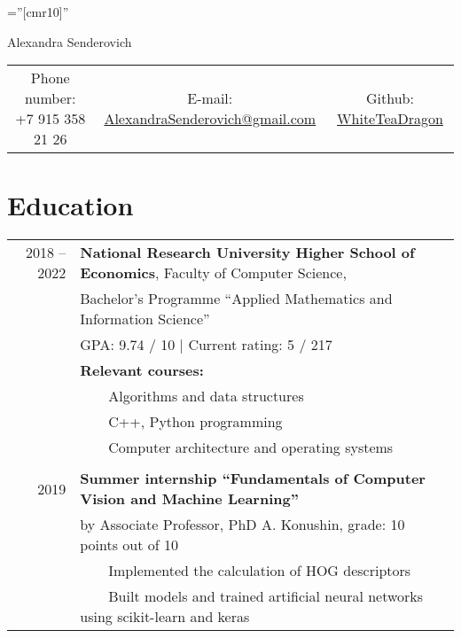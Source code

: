 \documentclass[a4paper,10pt]{article}
\newcommand{\tabitem}{~~\llap{\textbullet}~~}
\begin{document}

\pagestyle{empty} %

\font\fb=''[cmr10]'' %

\par{\centering
		{\Huge Alexandra Senderovich
	}\bigskip\par}


\begin{center}
\begin{tabular}{c c c}
     Phone number: +7 915 358 21 26 & E-mail: \href{mailto:alexandrasenderovich@gmail.com}{AlexandraSenderovich@gmail.com} & Github: \href{https://github.com/WhiteTeaDragon}{WhiteTeaDragon}
\end{tabular}
\end{center}

\section{Education}
\begin{tabular}{rl}	
2018 -- 2022 & \textbf{National Research University Higher School of Economics}, Faculty of Computer Science, \\ & Bachelor’s Programme “Applied Mathematics and Information Science”\\
& GPA: 9.74 / 10 | Current rating: 5 / 217 \\
& \textbf{Relevant courses:}\\
& \tabitem Algorithms and data structures \\
& \tabitem C++, Python programming \\
& \tabitem Computer architecture and operating systems \\
& \\
2019 & \textbf{Summer internship “Fundamentals of Computer Vision and Machine Learning”} \\
& by Associate Professor, PhD A. Konushin, grade: 10 points out of 10 \\
& \tabitem Implemented the calculation of HOG descriptors \\
& \tabitem Built models and trained artificial neural networks using scikit-learn and keras 
\end{tabular}
\end{document}

